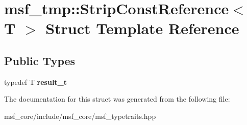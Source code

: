 \hypertarget{structmsf__tmp_1_1StripConstReference}{\section{msf\-\_\-tmp\-:\-:Strip\-Const\-Reference$<$ T $>$ Struct Template Reference}
\label{structmsf__tmp_1_1StripConstReference}
}
\subsection*{Public Types}
\begin{DoxyCompactItemize}
\item 
\hypertarget{structmsf__tmp_1_1StripConstReference_a4069e12bbcefd7f81f4596cee921b0df}{typedef T {\bfseries result\-\_\-t}}\label{structmsf__tmp_1_1StripConstReference_a4069e12bbcefd7f81f4596cee921b0df}

\end{DoxyCompactItemize}


The documentation for this struct was generated from the following file\-:\begin{DoxyCompactItemize}
\item 
msf\-\_\-core/include/msf\-\_\-core/msf\-\_\-typetraits.\-hpp\end{DoxyCompactItemize}
